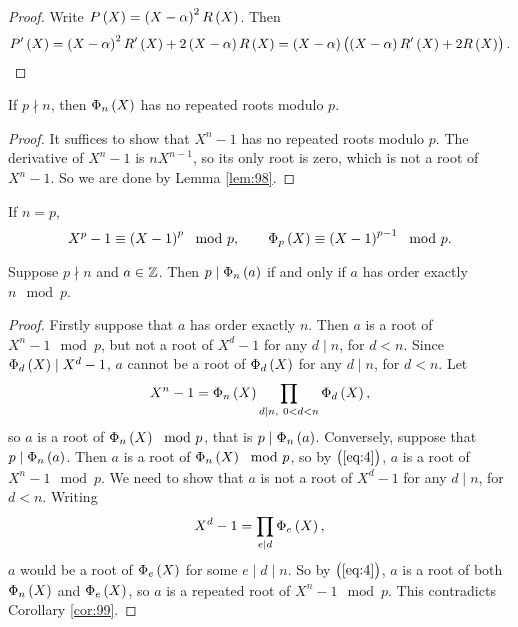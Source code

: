 \begin{proof}
Write $ P\br{X} = \br{X - \alpha}^2R\br{X} $. Then
$$ P'\br{X} = \br{X - \alpha}^2R'\br{X} + 2\br{X - \alpha}R\br{X} = \br{X - \alpha}\br{\br{X - \alpha}R'\br{X} + 2R\br{X}}. $$
\end{proof}

\begin{corollary}
\label{cor:99}
If $ p \nmid n $, then $ \Phi_n\br{X} $ has no repeated roots modulo $ p $.
\end{corollary}

\begin{proof}
It suffices to show that $ X^n - 1 $ has no repeated roots modulo $ p $. The derivative of $ X^n - 1 $ is $ nX^{n - 1} $, so its only root is zero, which is not a root of $ X^n - 1 $. So we are done by Lemma \ref{lem:98}.
\end{proof}

\begin{note*}
If $ n = p $,
$$ X^p - 1 \equiv \br{X - 1}^p \mod p, \qquad \Phi_p\br{X} \equiv \br{X - 1}^{p - 1} \mod p. $$
\end{note*}

\begin{theorem}
\label{thm:100}
Suppose $ p \nmid n $ and $ a \in \mathbb{Z} $. Then $ p \mid \Phi_n\br{a} $ if and only if $ a $ has order exactly $ n \mod p $.
\end{theorem}

\begin{proof}
Firstly suppose that $ a $ has order exactly $ n $. Then $ a $ is a root of $ X^n - 1 \mod p $, but not a root of $ X^d - 1 $ for any $ d \mid n $, for $ d < n $. Since $ \Phi_d\br{X} \mid X^d - 1 $, $ a $ cannot be a root of $ \Phi_d\br{X} $ for any $ d \mid n $, for $ d < n $. Let
\begin{equation}
\label{eq:4}
X^n - 1 = \Phi_n\br{X}\prod_{d \mid n, \ 0 < d < n} \Phi_d\br{X},
\end{equation}
so $ a $ is a root of $ \Phi_n\br{X} \mod p $, that is $ p \mid \Phi_n\br{a} $. Conversely, suppose that $ p \mid \Phi_n\br{a} $. Then $ a $ is a root of $ \Phi_n\br{X} \mod p $, so by $ \br{\ref{eq:4}} $, $ a $ is a root of $ X^n - 1 \mod p $. We need to show that $ a $ is not a root of $ X^d - 1 $ for any $ d \mid n $, for $ d < n $. Writing
$$ X^d - 1 = \prod_{e \mid d} \Phi_e\br{X}, $$
$ a $ would be a root of $ \Phi_e\br{X} $ for some $ e \mid d \mid n $. So by $ \br{\ref{eq:4}} $, $ a $ is a root of both $ \Phi_n\br{X} $ and $ \Phi_e\br{X} $, so $ a $ is a repeated root of $ X^n - 1 \mod p $. This contradicts Corollary \ref{cor:99}.
\end{proof}

